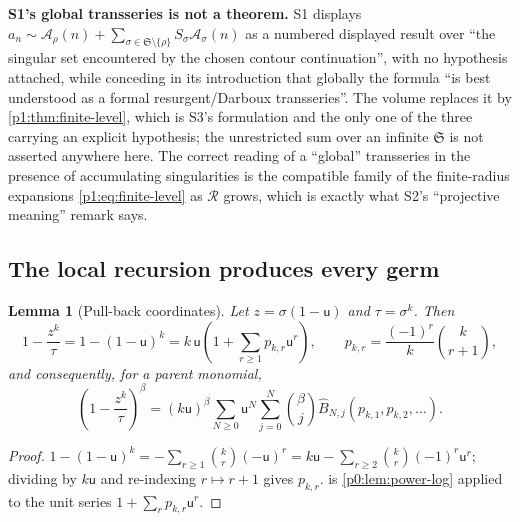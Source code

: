 \documentclass[11pt,a4paper,oneside]{book}
\theoremstyle{plain}
\newtheorem{lemma}[theorem]{Lemma}
\theoremstyle{definition}
\theoremstyle{remark}
\newcommand{\OB}{\widehat{B}}
\begin{document}
\begin{repairbox}
\textbf{\textsf{S1}'s global transseries is not a theorem.}  \textsf{S1} displays
$a_n\sim\mathcal A_\rho(n)+\sum_{\sigma\in\mathfrak S\setminus \{\rho\}}S_\sigma\mathcal
A_\sigma(n)$ as a numbered displayed result over ``the singular set encountered by the chosen
contour continuation'', with no hypothesis attached, while conceding in its introduction that
globally the formula ``is best understood as a formal resurgent/Darboux transseries''. The
volume replaces it by \cref{p1:thm:finite-level}, which is \textsf{S3}'s formulation and the
only one of the three carrying an explicit hypothesis; the unrestricted sum over an infinite
$\mathfrak S$ is not asserted anywhere here. The correct reading of a ``global'' transseries
in the presence of accumulating singularities is the compatible family of the finite-radius
expansions \cref{p1:eq:finite-level} as $\mathcal R$ grows, which is exactly what
\textsf{S2}'s ``projective meaning'' remark says.
\end{repairbox}

\subsection{The local recursion produces every germ}

\begin{lemma}[Pull-back coordinates]
\label{p1:lem:pullback}
Let $z=\sigma(1-\mathsf u)$ and $\tau=\sigma^{k}$.  Then
\begin{equation}
 1-\frac{z^{k}}{\tau}=1-(1-\mathsf u)^{k}
 =k\,\mathsf u\left(1+\sum_{r\ge1}p_{k,r}\mathsf u^{r}\right),
 \qquad
 p_{k,r}=\frac{(-1)^{r}}{k}\binom{k}{r+1},
 \label{p1:eq:pullback}
\end{equation}
and consequently, for a parent monomial,
\begin{equation}
 \left(1-\frac{z^{k}}{\tau}\right)^{\beta}
 =(k\mathsf u)^{\beta}\sum_{N\ge0}\mathsf u^{N}
 \sum_{j=0}^{N}\binom{\beta}{j}
 \OB_{N,j}(p_{k,1},p_{k,2},\ldots).
 \label{p1:eq:pullback-coeff}
\end{equation}
\end{lemma}

\begin{proof}
$1-(1-\mathsf u)^{k}=-\sum_{r\ge1}\binom kr(-\mathsf u)^{r} =k\mathsf u-\sum_{r\ge2}\binom
kr(-1)^{r}\mathsf u^{r}$; dividing by $k\mathsf u$ and re-indexing $r\mapsto r+1$ gives
$p_{k,r}$.  is \cref{p0:lem:power-log} applied to the unit series
$1+\sum_rp_{k,r}\mathsf u^{r}$.
\end{proof}
\end{document}
